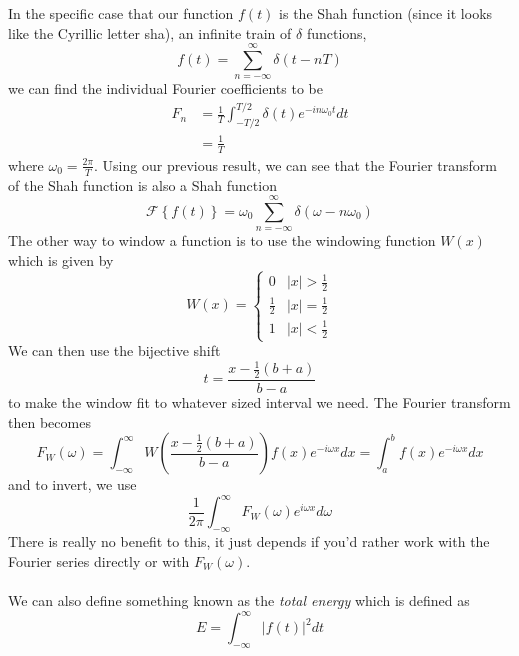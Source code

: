 \documentclass{report}
\theoremstyle{definition}
\theoremstyle{remark}
\newcommand{\ft}[1]{\mathscr{F}\left\{ #1\right\}}
\begin{document}
In the specific case that our function $f(t)$ is the Shah function (since it looks like the Cyrillic letter sha), an infinite train of $\delta$ functions,
\begin{equation*}
    f(t) = \sum^\infty_{n=-\infty}\delta(t-nT)
\end{equation*}
we can find the individual Fourier coefficients to be 
\begin{equation*}
    \begin{split}
        F_n&=\frac{1}{T}\int^{T/2}_{-T/2}\delta(t)e^{-in\omega_0t}dt \\
        &=\frac{1}{T}
    \end{split}
\end{equation*}
where $\omega_0 = \frac{2\pi}{T}$. Using our previous result, we can see that the Fourier transform of the Shah function is also a Shah function 
\begin{equation*}
    \ft{f(t)}=\omega_0\sum^\infty_{n=-\infty}\delta(\omega -n\omega_0)
\end{equation*}
The other way to window a function is to use the windowing function $W(x)$ which is given by 
\begin{equation*}
    W(x) = \begin{cases}
        0 &|x|>\frac{1}{2}\\ \frac{1}{2} &|x|=\frac{1}{2} \\ 1 &|x|<\frac{1}{2}
    \end{cases}
\end{equation*}
We can then use the bijective shift 
\begin{equation*}
    t=\frac{x-\frac{1}{2}(b+a)}{b-a}
\end{equation*}
to make the window fit to whatever sized interval we need. The Fourier transform then becomes 
\begin{equation*}
    F_W(\omega)=\int^\infty_{-\infty}W\left( \frac{x-\frac{1}{2}(b+a)}{b-a} \right)f(x)e^{-i\omega x} dx = \int^b_af(x)e^{-i\omega x}dx
\end{equation*}
and to invert, we use 
\begin{equation*}
    \frac{1}{2\pi}\int^\infty_{-\infty}F_W(\omega)e^{i\omega x}d\omega
\end{equation*}
There is really no benefit to this, it just depends if you'd rather work with the Fourier series directly or with $F_W(\omega)$.\\\\
We can also define something known as the \textit{total energy} which is defined as 
\begin{equation*}
    E = \int^\infty_{-\infty}|f(t)|^2dt
\end{equation*}
\end{document}
